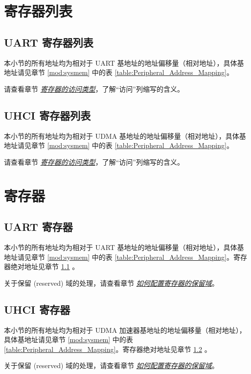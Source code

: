 \documentclass[main\_\_CN.tex]{subfiles}
\begin{document}
\hypertarget{uart-reg-summ}{}
\section{寄存器列表}

\subsection{UART 寄存器列表}\label{sec:uart-reg-summ}

本小节的所有地址均为相对于 UART 基地址的地址偏移量（相对地址），具体基地址请见章节 \ref{mod:sysmem} \textit{} 中的表 \ref{table:Peripheral_Address_Mapping}。

请查看章节 \hyperref[glossary-access-types]{\textit{寄存器的访问类型}}，了解“访问”列缩写的含义。



\subsection{UHCI 寄存器列表}\label{sec:uhci-reg-summ}

本小节的所有地址均为相对于 UDMA 基地址的地址偏移量（相对地址），具体基地址请见章节 \ref{mod:sysmem} \textit{} 中的表 \ref{table:Peripheral_Address_Mapping}。

请查看章节 \hyperref[glossary-access-types]{\textit{寄存器的访问类型}}，了解“访问”列缩写的含义。


{\clearpage}

\section{寄存器}

\subsection{UART 寄存器}

本小节的所有地址均为相对于 UART 基地址的地址偏移量（相对地址），具体基地址请见章节 \ref{mod:sysmem} \textit{} 中的表 \ref{table:Peripheral_Address_Mapping}。寄存器绝对地址见章节 \ref{sec:uart-reg-summ} \textit{}。

关于保留 (reserved) 域的处理，请查看章节 \hyperref[programming-reserved-field]{\textit{如何配置寄存器的保留域}}。



\subsection{UHCI 寄存器}

本小节的所有地址均为相对于 UDMA 加速器基地址的地址偏移量（相对地址），具体基地址请见章节 \ref{mod:sysmem} \textit{} 中的表 \ref{table:Peripheral_Address_Mapping}。寄存器绝对地址见章节 \ref{sec:uhci-reg-summ} \textit{}。

关于保留 (reserved) 域的处理，请查看章节 \hyperref[programming-reserved-field]{\textit{如何配置寄存器的保留域}}。


\end{document}
